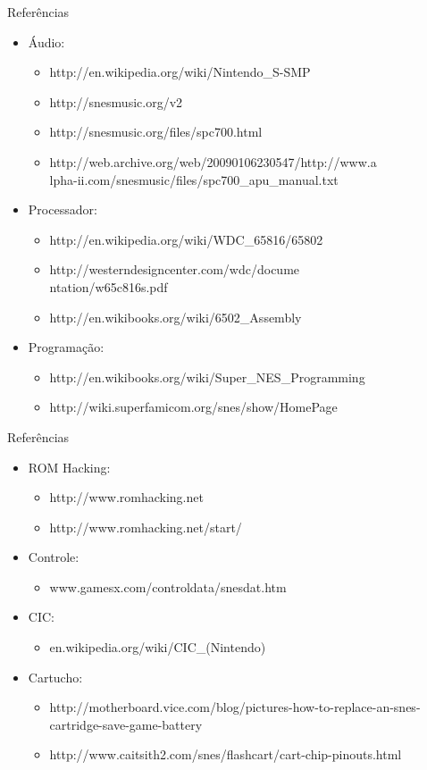 \documentclass[xcolor=svgnames,handout]{beamer}
\begin{document}
\begin{frame}{Referências}
\begin{itemize}
\item Áudio:
\begin{itemize}	
\item 	http://en.wikipedia.org/wiki/Nintendo\_S-SMP
\item 	http://snesmusic.org/v2
\item 	http://snesmusic.org/files/spc700.html
\item 	http://web.archive.org/web/20090106230547/http://www.a\\lpha-ii.com/snesmusic/files/spc700\_apu\_manual.txt
\end{itemize}
\item Processador:
\begin{itemize}	
\item 	http://en.wikipedia.org/wiki/WDC\_65816/65802
\item 		http://westerndesigncenter.com/wdc/docume\\ntation/w65c816s.pdf
\item 	http://en.wikibooks.org/wiki/6502\_Assembly
\end{itemize}
\item Programação:
\begin{itemize}	
\item 	http://en.wikibooks.org/wiki/Super\_NES\_Programming
\item 	http://wiki.superfamicom.org/snes/show/HomePage
\end{itemize}
\end{itemize}
\end{frame}

\begin{frame}{Referências}
\begin{itemize}
\item ROM Hacking:
\begin{itemize}	
\item 	http://www.romhacking.net
\item 	http://www.romhacking.net/start/
\end{itemize}
\item Controle:
\begin{itemize}	
\item www.gamesx.com/controldata/snesdat.htm
\end{itemize}
\item CIC:
\begin{itemize}	
\item en.wikipedia.org/wiki/CIC\_(Nintendo)
\end{itemize}
\item Cartucho:
\begin{itemize}
\item http://motherboard.vice.com/blog/pictures-how-to-replace-an-snes-cartridge-save-game-battery
\item http://www.caitsith2.com/snes/flashcart/cart-chip-pinouts.html
\end{itemize}
\end{itemize}

\end{frame}
\end{document}
